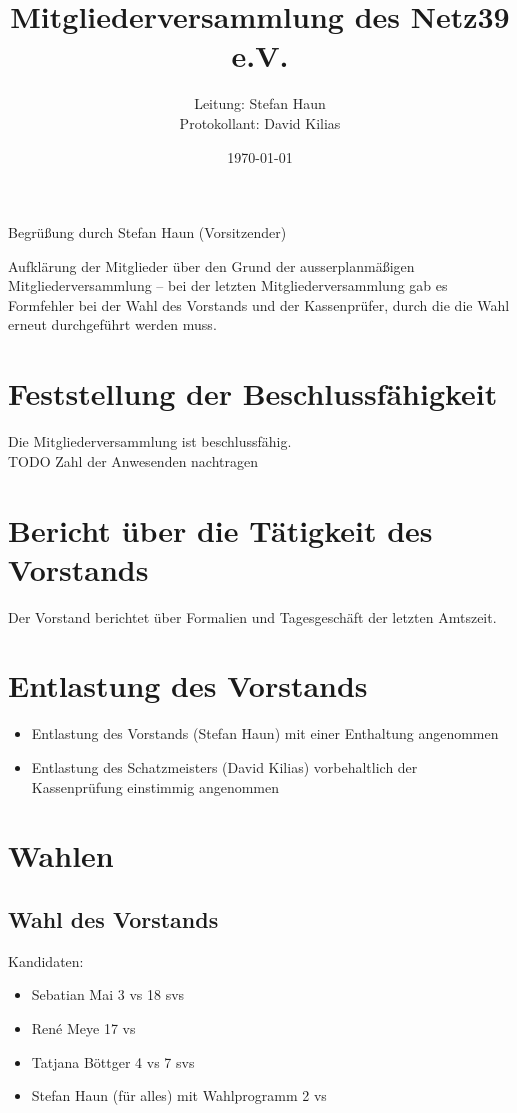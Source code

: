 \documentclass[a4paper,12pt,titlepage]{scrartcl}
\title{Mitgliederversammlung des Netz39 e.V.}
\author{
Leitung: Stefan Haun \\
Protokollant: David Kilias
}
\date{\today} %
\begin{document}
\maketitle
\tableofcontents
\clearpage
Begrüßung durch Stefan Haun (Vorsitzender)

Aufklärung der Mitglieder über den Grund der ausserplanmäßigen Mitgliederversammlung – bei der letzten Mitgliederversammlung gab es Formfehler bei der Wahl des Vorstands und der Kassenprüfer, durch die die Wahl erneut durchgeführt werden muss.

\section{Feststellung der Beschlussfähigkeit}
Die Mitgliederversammlung ist beschlussfähig. \\
TODO Zahl der Anwesenden nachtragen

\section{Bericht über die Tätigkeit des Vorstands}
Der Vorstand berichtet über Formalien und Tagesgeschäft der letzten Amtszeit.

\section{Entlastung des Vorstands}
\begin{itemize}
	\item Entlastung des Vorstands (Stefan Haun) mit einer Enthaltung angenommen
	\item Entlastung des Schatzmeisters (David Kilias) vorbehaltlich der Kassenprüfung 
  einstimmig angenommen
\end{itemize}

\section{Wahlen}
\subsection{Wahl des Vorstands}
Kandidaten:
\begin{itemize}
  \item Sebatian Mai 3 vs 18 svs
  \item René Meye 17 vs
  \item Tatjana Böttger 4 vs 7 svs
  \item Stefan Haun (für alles) mit Wahlprogramm 2 vs
\end{itemize}
\end{document}
